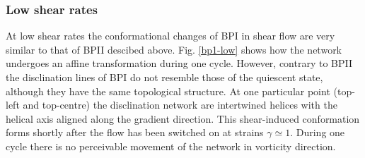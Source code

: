 \documentclass[aps,pre,reprint,superscriptaddress]{revtex4}
\begin{document}
\subsubsection{Low shear rates}

At low shear rates the conformational changes of BPI in shear flow are very similar to 
that of BPII descibed above. Fig. \ref{bp1-low} shows how the network undergoes an affine 
transformation during one cycle. However, contrary to BPII the disclination lines of BPI 
do not resemble those of the quiescent state, although they have the same topological
structure. At one particular point (top-left and top-centre) 
the disclination network are intertwined helices with the helical axis aligned
along the gradient direction. This shear-induced conformation forms shortly after the
flow has been switched on at strains $\gamma\simeq1$.
During one cycle there is no perceivable movement of the network in vorticity direction.
\end{document}
